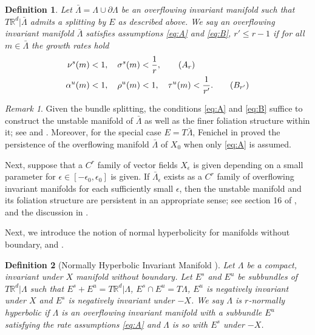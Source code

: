 \documentclass[11pt]{article}
\def\blue{\color{blue}}
\newcommand{\tcb}{}
\newtheorem{definition}{Definition}[section]
\theoremstyle{remark}
\newtheorem{remark}{Remark}[section]
\begin{document}
\begin{definition} \label{def:over}
Let $\bar{\Lambda}=\Lambda \cup \partial\Lambda$  be an overflowing invariant manifold {\blue such that $T \mathbb{R}^d|\bar\Lambda$} admits a splitting by $E$ as described  above. We say an overflowing invariant manifold $\bar{\Lambda}$ satisfies assumptions \eqref{eq:A} and \eqref{eq:B}, $r'\le r-1$ if for all $m\in \bar{\Lambda}$ the  growth rates hold
\begin{align}
\nu^s(m)&<1, \quad \sigma^s(m)<\frac{1}{r}, \label{eq:A}\tag{$A_r$}   \\
\alpha^u(m)&<1, \quad \rho^u(m)<1, \quad \tau^u(m)<\frac{1}{r'}. \label{eq:B}\tag{$B_{r'}$}
\end{align}
\end{definition}
\begin{remark}
\tcb{
Given the bundle splitting, the conditions  \eqref{eq:A} and \eqref{eq:B} suffice to construct the unstable manifold of $\bar\Lambda$
as well as the finer foliation structure within it; see \cite[Theorem 4]{fenichel_asymptotic_1974} and \cite[Theorem 3]{fenichel_asymptotic_1977}. Moreover, for the special case $E=T\bar\Lambda$, Fenichel  in \cite{fenichel_persistence_1972}  proved the persistence of the overflowing manifold $\bar\Lambda$ of $X_0$  when only \eqref{eq:A} is assumed.


Next, suppose that a $C^r$ family of vector fields $X_\epsilon$ is given depending on a small parameter for $\epsilon\in[-\epsilon_0,\epsilon_0]$ is given.
If $\bar\Lambda_\epsilon$ exists as a $C^r$ family of overflowing invariant manifolds for each sufficiently small $\epsilon$,
then the unstable manifold and its foliation structure are persistent in an appropriate sense; see section 16 of \cite{fenichel_geometric_1979}, and the discussion in \cite[p. 90]{fenichel_geometric_1979}.
}
\end{remark}


Next, we introduce the notion of normal hyperbolicity for manifolds without boundary,  \cite[p.89]{fenichel_geometric_1979} and \cite[p.221]{fenichel_persistence_1972}.
\begin{definition}[Normally Hyperbolic Invariant Manifold \cite{fenichel_geometric_1979}]\label{def:nhim}
Let $\Lambda$ be a compact,  invariant under $X$  manifold without boundary.
 Let $E^s$ and $E^u$ be subbundles of $T \mathbb{R}^d|\Lambda$ such that $E^s + E^u = T \mathbb{R}^d|\Lambda$, $E^s\cap E^u=T\Lambda$, $E^u$ is negatively invariant under $X$ and $E^s$ is negatively invariant under $-X$.
 We say $\Lambda$ is $r$-normally hyperbolic if $\Lambda$ is an overflowing invariant manifold with a subbundle $E^u$ satisfying the rate assumptions \eqref{eq:A} and $\Lambda$ is so with $E^s$ under $-X$.
\end{definition}
\end{document}
